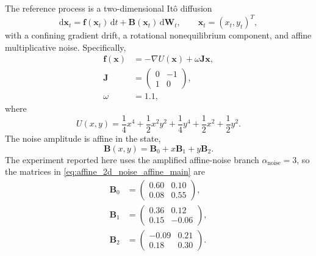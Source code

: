 \documentclass[11pt,twoside,fleqn]{article}
\renewcommand{\d}{\mathrm{d}}
\begin{document}
The reference process is a two-dimensional It\^o diffusion
\begin{equation}
    \d \bm{x}_t
    =
    \bm{f}(\bm{x}_t)\,\d t
    +
    \bm{B}(\bm{x}_t)\,\d \bm{W}_t,
    \qquad
    \bm{x}_t=(x_t,y_t)^T,
    \label{eq:affine_2d_reference_sde_main}
\end{equation}
with a confining gradient drift, a rotational nonequilibrium component, and affine multiplicative noise. Specifically,
\begin{equation}
\begin{aligned}
    \bm{f}(\bm{x})
    &=
    -\nabla U(\bm{x})
    +
    \omega \bm{J}\bm{x},
    \\
    \bm{J}
    &=
    \begin{pmatrix}
        0 & -1\\
        1 & 0
    \end{pmatrix},
    \\
    \omega&=1.1,
\end{aligned}
    \label{eq:affine_2d_drift_main}
\end{equation}
where
\begin{equation}
    U(x,y)
    =
    \frac{1}{4}x^4
    +
    \frac{1}{2}x^2y^2
    +
    \frac{1}{4}y^4
    +
    \frac{1}{2}x^2
    +
    \frac{1}{2}y^2.
    \label{eq:affine_2d_potential_main}
\end{equation}
The noise amplitude is affine in the state,
\begin{equation}
    \bm{B}(x,y)
    =
    \bm{B}_0+x\bm{B}_1+y\bm{B}_2.
    \label{eq:affine_2d_noise_affine_main}
\end{equation}
The experiment reported here uses the amplified affine-noise branch
\(\alpha_{\mathrm{noise}}=3\), so the matrices in
\eqref{eq:affine_2d_noise_affine_main} are
\begin{equation}
\begin{aligned}
    \bm{B}_0
    &=
    \begin{pmatrix}
        0.60 & 0.10\\
        0.08 & 0.55
    \end{pmatrix},
    \\
    \bm{B}_1
    &=
    \begin{pmatrix}
        0.36 & 0.12\\
        0.15 & -0.06
    \end{pmatrix},
    \\
    \bm{B}_2
    &=
    \begin{pmatrix}
        -0.09 & 0.21\\
        0.18 & 0.30
    \end{pmatrix}.
\end{aligned}
    \label{eq:affine_2d_B_coefficients_main}
\end{equation}
\end{document}
